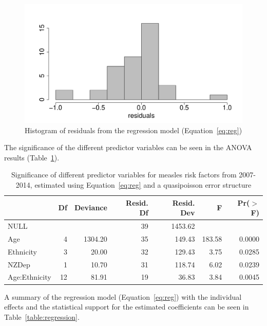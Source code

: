 \documentclass{article}
\begin{document}
\begin{figure}
\begin{center}
\includegraphics{draftfinalreport-017}
\end{center}
\caption{Histogram of residuals from the regression model (Equation~\ref{eq:reg})}
\label{fig:resid}
\end{figure}

The significance of the different predictor variables can be seen in the ANOVA results (Table~\ref{table:anova}).
\par
\vspace{5mm} %
\begin{table}
\begin{tabular}{lrrrrrr}
  \hline
 & Df & Deviance & Resid. Df & Resid. Dev & F & Pr($>$F) \\ 
  \hline
NULL &  &  & 39 & 1453.62 &  &  \\ 
  Age & 4 & 1304.20 & 35 & 149.43 & 183.58 & 0.0000 \\ 
  Ethnicity & 3 & 20.00 & 32 & 129.43 & 3.75 & 0.0285 \\ 
  NZDep & 1 & 10.70 & 31 & 118.74 & 6.02 & 0.0239 \\ 
  Age:Ethnicity & 12 & 81.91 & 19 & 36.83 & 3.84 & 0.0045 \\ 
   \hline
\end{tabular}\caption{Significance of different predictor variables for measles risk factors from 2007-2014, estimated using Equation~\ref{eq:reg} and a quasipoisson error structure}
\label{table:anova}
\end{table}
\vspace{5mm} %
A summary of the regression model (Equation~\ref{eq:reg}) with the individual effects and the statistical support for the estimated coefficients can be seen in Table~\ref{table:regression}.
\end{document}
